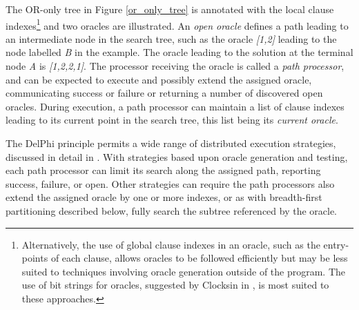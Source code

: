 \documentclass[a4paper,11pt,twoside]{article}
\begin{document}
The OR-only tree in Figure \ref{or_only_tree} is annotated with the local clause
indexes\footnote{Alternatively, the use of global clause
indexes in an oracle, such as the entry-points of each
clause, allows oracles to be followed efficiently but may be less suited to
techniques involving oracle generation outside of the program.
The use of bit strings for oracles, suggested by Clocksin in \cite{Clo87, Clo92}, is 
most suited to these approaches.}
and two oracles are illustrated.  An \textit{open oracle} defines
a path leading to an intermediate node in the search tree, such as the
oracle \textit{[1,2]} leading to the node labelled \textit{B} in the
example.  The oracle leading to the solution at the terminal node 
\textit{A} is \textit{[1,2,2,1]}.
The processor receiving the oracle is called a
\textit{path processor}, and can be expected to execute and possibly extend
the assigned oracle, communicating success or failure or returning a number
of discovered open oracles.
During execution, a path processor can maintain a
list of clause indexes leading to its current point in the search tree, this list
being its \textit{current oracle}.

The DelPhi principle permits a wide range of distributed execution strategies,
discussed in detail in \cite{Clo87, Sar95, Lew98}.  With strategies based
upon oracle generation and testing,
each path processor can limit its search along the assigned path, reporting success,
failure, or open.  Other strategies can require the path processors also extend
the assigned oracle by one or more indexes, or as with breadth-first partitioning
described below, fully search the subtree referenced by the oracle.
\end{document}
